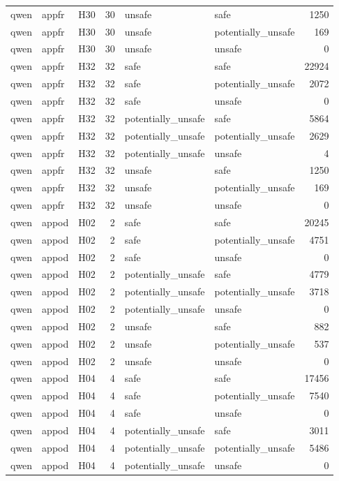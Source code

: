 \begin{table}[tbp]
\begin{tabular}{lllrllr}
qwen & appfr & H30 & 30 & unsafe & safe & 1250 \\
qwen & appfr & H30 & 30 & unsafe & potentially\_unsafe & 169 \\
qwen & appfr & H30 & 30 & unsafe & unsafe & 0 \\
qwen & appfr & H32 & 32 & safe & safe & 22924 \\
qwen & appfr & H32 & 32 & safe & potentially\_unsafe & 2072 \\
qwen & appfr & H32 & 32 & safe & unsafe & 0 \\
qwen & appfr & H32 & 32 & potentially\_unsafe & safe & 5864 \\
qwen & appfr & H32 & 32 & potentially\_unsafe & potentially\_unsafe & 2629 \\
qwen & appfr & H32 & 32 & potentially\_unsafe & unsafe & 4 \\
qwen & appfr & H32 & 32 & unsafe & safe & 1250 \\
qwen & appfr & H32 & 32 & unsafe & potentially\_unsafe & 169 \\
qwen & appfr & H32 & 32 & unsafe & unsafe & 0 \\
qwen & appod & H02 & 2 & safe & safe & 20245 \\
qwen & appod & H02 & 2 & safe & potentially\_unsafe & 4751 \\
qwen & appod & H02 & 2 & safe & unsafe & 0 \\
qwen & appod & H02 & 2 & potentially\_unsafe & safe & 4779 \\
qwen & appod & H02 & 2 & potentially\_unsafe & potentially\_unsafe & 3718 \\
qwen & appod & H02 & 2 & potentially\_unsafe & unsafe & 0 \\
qwen & appod & H02 & 2 & unsafe & safe & 882 \\
qwen & appod & H02 & 2 & unsafe & potentially\_unsafe & 537 \\
qwen & appod & H02 & 2 & unsafe & unsafe & 0 \\
qwen & appod & H04 & 4 & safe & safe & 17456 \\
qwen & appod & H04 & 4 & safe & potentially\_unsafe & 7540 \\
qwen & appod & H04 & 4 & safe & unsafe & 0 \\
qwen & appod & H04 & 4 & potentially\_unsafe & safe & 3011 \\
qwen & appod & H04 & 4 & potentially\_unsafe & potentially\_unsafe & 5486 \\
qwen & appod & H04 & 4 & potentially\_unsafe & unsafe & 0 \\

\end{tabular}
\end{table}
